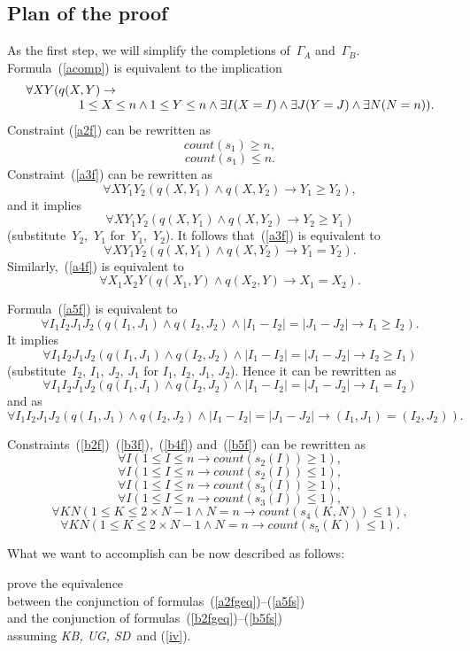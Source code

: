 \documentclass[11pt]{article}
\def\beq{\begin{equation}}
\def\eeq#1{\label{#1}\end{equation}}
\def\ba{\begin{array}}
\def\ea{\end{array}}
\def\kbugsd{\emph{KB, UG, SD}}
\newcommand{\co}{\ensuremath{\mathit{count}}}
\begin{document}
\begin{adjustwidth}{-1cm}{-1cm}
\section{Plan of the proof}
 
As the first step, we will simplify the
completions of~$\Gamma_A$ and~$\Gamma_B$.  Formula~(\ref{acomp})
is equivalent to the implication
\beq
\ba l
\forall X Y (q(X,Y) \to \\\hskip 15mm
1 \leq X \leq n \land 1 \leq Y \leq n \land \exists I(X=I)
\land \exists J(Y=J) \land \exists N(N=n)).
\ea
 \eeq{iv}
Constraint (\ref{a2f}) can be rewritten as
\beq
\co(s_1)\geq n,
\eeq{a2fgeq}
\beq
\co(s_1)\leq n.
\eeq{a2fleq}
Constraint~(\ref{a3f}) can be rewritten as
$$\forall XY_1Y_2(q(X,Y_1) \land q(X,Y_2) \to Y_1 \geq Y_2),$$
and it implies
$$\forall XY_1Y_2(q(X,Y_1) \land q(X,Y_2) \to Y_2 \geq Y_1)$$
(substitute~$Y_2$,~$Y_1$ for~$Y_1$,~$Y_2$). It follows that~(\ref{a3f}) is
equivalent to
\beq
\forall XY_1Y_2(q(X,Y_1) \land q(X,Y_2) \to Y_1 = Y_2).
\eeq{a3fs}
Similarly,~(\ref{a4f}) is equivalent to
\beq
\forall X_1X_2Y(q(X_1,Y) \land q(X_2,Y) \to X_1 = X_2).
\eeq{a4fs}

Formula~(\ref{a5f})
is equivalent to
$$\forall I_1I_2J_1J_2
(q(I_1,J_1) \land q(I_2,J_2) \land |I_1-I_2|=|J_1-J_2| \to I_1 \geq I_2).$$
It implies
$$\forall I_1I_2J_1J_2
(q(I_1,J_1) \land q(I_2,J_2) \land |I_1-I_2|=|J_1-J_2| \to I_2 \geq I_1)
$$
(substitute~$I_2,\,I_1,\,J_2,\,J_1$ for $I_1,\,I_2,\,J_1,\,J_2$).
Hence it can be rewritten as
$$
\forall I_1I_2J_1J_2
(q(I_1,J_1) \land q(I_2,J_2) \land |I_1-I_2|=|J_1-J_2|\to I_1= I_2)
$$
and as
\beq
\forall I_1I_2J_1J_2
(q(I_1,J_1)\land q(I_2,J_2) \land |I_1-I_2|=|J_1-J_2|
\to (I_1,J_1) = (I_2,J_2)).
\eeq{a5fs}

Constraints~(\ref{b2f})~(\ref{b3f}),~(\ref{b4f}) and~(\ref{b5f})
can be rewritten as
\beq
\forall I(1\leq I\leq n \to \co(s_2(I)) \geq 1),
\eeq{b2fgeq}
\beq
\forall I(1\leq I\leq n \to \co(s_2(I))\leq 1),
\eeq{b2fleq}
\beq
\forall I(1\leq I\leq n \to \co(s_3(I))\geq 1),
\eeq{b3fgeq}
\beq
\forall I(1\leq I\leq n \to \co(s_3(I))\leq 1),
\eeq{b3fleq}
\beq
\forall KN(1\leq K\leq 2\times N-1  \land N=n \to \co(s_4(K,N))\leq 1),
\eeq{b4fs}
\beq
\forall KN(1\leq K\leq 2\times N-1 \land N=n \to \co(s_5(K))\leq 1).
\eeq{b5fs}

What we want to accomplish can be now described as follows:

\medskip\begin{center}
prove the equivalence\\
between the conjunction of formulas~(\ref{a2fgeq})--(\ref{a5fs})\\
and the conjunction of formulas~(\ref{b2fgeq})--(\ref{b5fs})\\
assuming \kbugsd\ and (\ref{iv}).
\end{center}\medskip


\end{adjustwidth}
\end{document}
